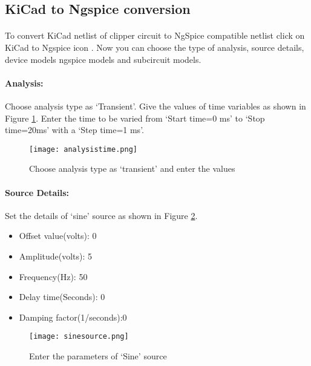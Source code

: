 \subsection*{KiCad to Ngspice conversion}

\paragraph{} To convert KiCad netlist of clipper circuit to NgSpice
compatible netlist click on KiCad to Ngspice icon .  Now you can choose the type of analysis, source details, device models ngspice models and subcircuit models.


%

\paragraph{Analysis:}Choose analysis type as `Transient'. Give the values of time variables as shown in Figure \ref{analysistime}. Enter the time to be varied from `Start time=0 ms' to `Stop time=20ms' with a `Step time=1 ms'.

\begin{figure}[h]
\centering
\texttt{[image: analysistime.png]}
\caption{Choose analysis type as `transient' and enter the values}
\label{analysistime}
\end{figure}

\paragraph{Source Details:} Set the details of `sine' source as shown in Figure \ref{sinesource}.
\begin{itemize}
\item
Offset value(volts): 0
\item
Amplitude(volts): 5
\item
Frequency(Hz): 50
\item
Delay time(Seconds): 0
\item
Damping factor(1/seconds):0

\end{itemize}
\begin{figure}[h]
\centering
\texttt{[image: sinesource.png]}
\caption{Enter the parameters of `Sine' source}
\label{sinesource}
\end{figure}


